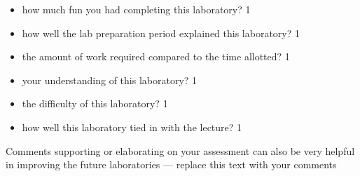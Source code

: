 \documentclass[epsfig,12pt]{article}
\begin{document}
\begin{itemize}
\item
	how much fun you had completing this laboratory?
	\hfill 1

\item
	how well the lab preparation period explained this laboratory?
	\hfill 1

\item
	the amount of work required compared to the time allotted?
	\hfill 1

\item
	your understanding of this laboratory?
	\hfill 1

\item
	the difficulty of this laboratory?
	\hfill 1

\item
	how well this laboratory tied in with the lecture?
	\hfill 1
\end{itemize}

	Comments supporting or elaborating on your assessment can also be very helpful in improving the future laboratories
	--- replace this text with your comments
\end{document}
